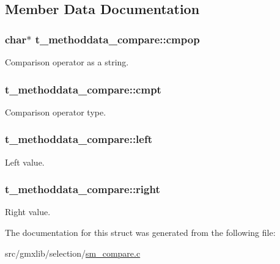 \subsection{\-Member \-Data \-Documentation}
\hypertarget{structt__methoddata__compare_a66fca42300c33bb7585d5b94d28b6254}{
\subsubsection[{cmpop}]{\setlength{\rightskip}{0pt plus 5cm}char$\ast$ {\bf t\-\_\-methoddata\-\_\-compare\-::cmpop}}}\label{structt__methoddata__compare_a66fca42300c33bb7585d5b94d28b6254}
\-Comparison operator as a string. \hypertarget{structt__methoddata__compare_a372ef3b61c063e2ee4cf032cc56879d7}{
\subsubsection[{cmpt}]{ {\bf t\-\_\-methoddata\-\_\-compare\-::cmpt}}}\label{structt__methoddata__compare_a372ef3b61c063e2ee4cf032cc56879d7}
\-Comparison operator type. \hypertarget{structt__methoddata__compare_aa715855f77b5f7bbf854aff0fc29102d}{
\subsubsection[{left}]{ {\bf t\-\_\-methoddata\-\_\-compare\-::left}}}\label{structt__methoddata__compare_aa715855f77b5f7bbf854aff0fc29102d}
\-Left value. \hypertarget{structt__methoddata__compare_ac382cfe023969100b9b77c3a6120e44b}{
\subsubsection[{right}]{ {\bf t\-\_\-methoddata\-\_\-compare\-::right}}}\label{structt__methoddata__compare_ac382cfe023969100b9b77c3a6120e44b}
\-Right value. 

\-The documentation for this struct was generated from the following file\-:\begin{DoxyCompactItemize}
\item 
src/gmxlib/selection/\hyperlink{sm__compare_8c}{sm\-\_\-compare.\-c}\end{DoxyCompactItemize}

